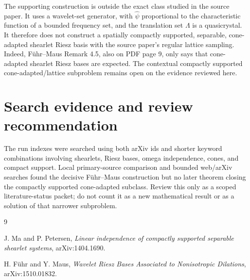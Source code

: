 \documentclass[11pt]{article}
\begin{document}
The supporting construction is outside the exact class studied in the source
paper. It uses a wavelet-set generator, with $\widehat\psi$ proportional to
the characteristic function of a bounded frequency set, and the translation
set $\Lambda$ is a quasicrystal. It therefore does not construct a spatially
compactly supported, separable, cone-adapted shearlet Riesz basis with the
source paper's regular lattice sampling. Indeed, Führ--Maus Remark 4.5, also
on PDF page 9, only says that cone-adapted shearlet Riesz bases are expected.
The contextual compactly supported cone-adapted/lattice subproblem remains
open on the evidence reviewed here.

\section*{Search evidence and review recommendation}

The run indexes were searched using both arXiv ids and shorter keyword
combinations involving shearlets, Riesz bases, omega independence, cones, and
compact support. Local
primary-source comparison and bounded web/arXiv searches found the decisive
Führ--Maus construction but no later theorem closing the compactly supported
cone-adapted subclass. Review this only as a scoped literature-status packet;
do not count it as a new mathematical result or as a solution of that narrower
subproblem.

\raggedright
\begin{thebibliography}{9}

J. Ma and P. Petersen,
\emph{Linear independence of compactly supported separable shearlet systems},
arXiv:1404.1690.

H. F\"uhr and Y. Maus,
\emph{Wavelet Riesz Bases Associated to Nonisotropic Dilations},
arXiv:1510.01832.

\end{thebibliography}
\end{document}
